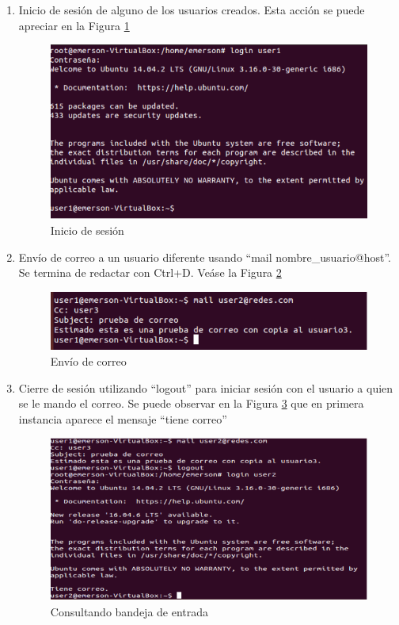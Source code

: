 \begin{enumerate}
    \item Inicio de sesión de alguno de los usuarios creados. Esta acción se puede apreciar en la Figura \ref{fig:smtp8}
    
    \begin{figure}[H]
        \centering
        \includegraphics[scale=.85]{imagenes/primero/paso8_smtp.PNG}
        \caption{Inicio de sesión}
        \label{fig:smtp8}
    \end{figure}
    
    \item Envío de correo a un usuario diferente usando ``mail nombre\_usuario@host''. Se termina de redactar con Ctrl+D. Veáse la Figura \ref{fig:smtp9}
    
    \begin{figure}[H]
        \centering
        \includegraphics[scale=.77]{imagenes/primero/paso9_smtp.PNG}
        \caption{Envío de correo}
        \label{fig:smtp9}
    \end{figure}
    
    \item Cierre de sesión utilizando “logout” para iniciar sesión con el usuario a quien se le mando el correo. Se puede observar en la Figura \ref{fig:smtp10} que en primera instancia aparece el mensaje ``tiene correo''
    
    \begin{figure}[H]
        \centering
        \includegraphics[scale=.77]{imagenes/primero/paso10_smtp.PNG}
        \caption{Consultando bandeja de entrada}
        \label{fig:smtp10}
    \end{figure}
    

\end{enumerate}
